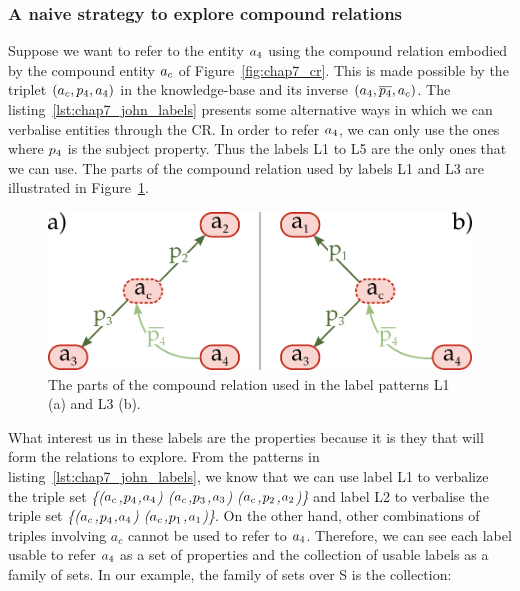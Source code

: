 \subsubsection{A naive strategy to explore compound relations}

Suppose we want to refer to the entity $a_4$ using the compound relation embodied by the compound entity $a_c$ of Figure~\ref{fig:chap7_cr}. This is made possible by the triplet $(a_c,p_4,a_4)$ in the knowledge-base and its inverse $(a_4, \overline{p_4}, a_c)$. The listing~\ref{lst:chap7_john_labels} presents some alternative ways in which we can verbalise entities through the CR. In order to refer $a_4$, we can only use the ones where $p_4$ is the subject property. Thus the labels L1 to L5 are the only ones that we can use. The parts of the compound relation used by labels L1 and L3 are illustrated in Figure~\ref{fig:chap7_cr_part}.

\begin{figure}[ht!]
\centering
\includegraphics[scale=0.4]{figures/chapter7/CR_part.png}
\caption{\label{fig:chap7_cr_part} The parts of the compound relation used in the label patterns L1 (a) and L3 (b).}
\end{figure}

What interest us in these labels are the properties because it is they that will form the relations to explore. From the patterns in listing~\ref{lst:chap7_john_labels}, we know that we can use label L1 to verbalize the triple set \textit{\{($a_c$,$p_4$,$a_4$) ($a_c$,$p_3$,$a_3$) ($a_c$,$p_2$,$a_2$)\}} and label L2 to verbalise the triple set \textit{\{($a_c$,$p_4$,$a_4$) ($a_c$,$p_1$,$a_1$)\}}. On the other hand, other combinations of triples involving $a_c$ cannot be used to refer to $a_4$. Therefore, we can see each label usable to refer $a_4$ as a set of properties and the collection of usable labels as a family of sets. In our example, the family of sets over S is the collection:

